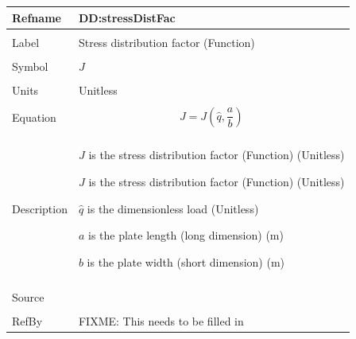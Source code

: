 \documentclass[12pt]{article}
\begin{document}
\noindent \begin{minipage}{\textwidth}
\begin{tabular}{p{} p{}}
\toprule \textbf{Refname} & \textbf{DD:stressDistFac}
\label{DD:stressDistFac}
\\ \midrule \\
Label & Stress distribution factor (Function)
\\ \midrule \\
Symbol & $J$
\\ \midrule \\
Units & Unitless
\\ \midrule \\
Equation & \begin{dmath}
           J=J\left(\hat{q},\frac{a}{b}\right)
           \end{dmath}
\\ \midrule \\
Description & \begin{symbDescription}
              \item{$J$ is the stress distribution factor (Function) (Unitless)}
              \item{$J$ is the stress distribution factor (Function) (Unitless)}
              \item{$\hat{q}$ is the dimensionless load (Unitless)}
              \item{$a$ is the plate length (long dimension) (m)}
              \item{$b$ is the plate width (short dimension) (m)}
              \end{symbDescription}
\\ \midrule \\
Source & 
\\ \midrule \\
RefBy & FIXME: This needs to be filled in
\\ \bottomrule \end{tabular}
\end{minipage}\\
~\newline
\end{document}
